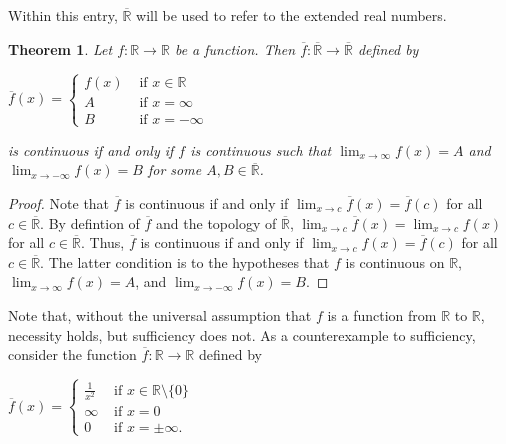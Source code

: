 \documentclass[12pt]{article}
\newtheorem{thm*}{Theorem}
\begin{document}
Within this entry, $\overline{\mathbb{R}}$ will be used to refer to the extended real numbers.

\begin{thm*}
Let $f \colon \mathbb{R} \to \mathbb{R}$ be a function.  Then $\overline{f} \colon \overline{\mathbb{R}} \to \overline{\mathbb{R}}$ defined by

\begin{center}
$\overline{f}(x)=\begin{cases}
f(x) & \text{ if } x \in \mathbb{R} \\
A & \text{ if } x=\infty \\
B & \text{ if } x=-\infty \end{cases}$
\end{center}

is continuous if and only if $f$ is continuous such that $\displaystyle \lim_{x \to \infty} f(x)=A$ and $\displaystyle \lim_{x \to -\infty} f(x)=B$ for some $A,B \in \overline{\mathbb{R}}$.
\end{thm*}

\begin{proof}
Note that $\overline{f}$ is continuous if and only if $\displaystyle \lim_{x \to c} \overline{f}(x)=\overline{f}(c)$ for all $c \in \overline{\mathbb{R}}$.  By defintion of $\overline{f}$ and the topology of $\overline{\mathbb{R}}$, $\displaystyle \lim_{x \to c} \overline{f}(x)=\displaystyle \lim_{x \to c} f(x)$ for all $c \in \overline{\mathbb{R}}$.  Thus, $\overline{f}$ is continuous if and only if $\displaystyle \lim_{x \to c} f(x)=\overline{f}(c)$ for all $c \in \overline{\mathbb{R}}$.  The latter condition is  to the hypotheses that $f$ is continuous on $\mathbb{R}$, $\displaystyle \lim_{x \to \infty}f(x)=A$, and $\displaystyle \lim_{x \to -\infty}f(x)=B$.
\end{proof}

Note that, without the universal assumption that $f$ is a function from $\mathbb{R}$ to $\mathbb{R}$, necessity holds, but sufficiency does not.  As a counterexample to sufficiency, consider the function $\overline{f} \colon \mathbb{R} \to \mathbb{R}$ defined by

\begin{center}
$\overline{f}(x)=\begin{cases}
\displaystyle \frac{1}{x^2} & \text{ if } x \in \mathbb{R} \setminus \{0\} \\
\infty & \text{ if } x=0 \\
0 & \text{ if } x=\pm \infty. \end{cases}$
\end{center}
\end{document}
